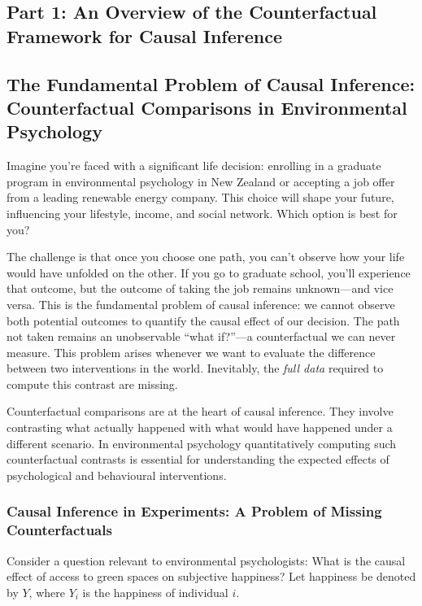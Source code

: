 \documentclass[
  singlecolumn]{article}
\begin{document}
\subsection{Part 1: An Overview of the Counterfactual Framework for
Causal Inference}\label{section-part1}

\subsection{The Fundamental Problem of Causal Inference: Counterfactual
Comparisons in Environmental
Psychology}\label{the-fundamental-problem-of-causal-inference-counterfactual-comparisons-in-environmental-psychology}

Imagine you're faced with a significant life decision: enrolling in a
graduate program in environmental psychology in New Zealand or accepting
a job offer from a leading renewable energy company. This choice will
shape your future, influencing your lifestyle, income, and social
network. Which option is best for you?

The challenge is that once you choose one path, you can't observe how
your life would have unfolded on the other. If you go to graduate
school, you'll experience that outcome, but the outcome of taking the
job remains unknown---and vice versa. This is the fundamental problem of
causal inference: we cannot observe both potential outcomes to quantify
the causal effect of our decision. The path not taken remains an
unobservable ``what if?''---a counterfactual we can never measure. This
problem arises whenever we want to evaluate the difference between two
interventions in the world. Inevitably, the \emph{full data} required to
compute this contrast are missing.

Counterfactual comparisons are at the heart of causal inference. They
involve contrasting what actually happened with what would have happened
under a different scenario. In environmental psychology quantitatively
computing such counterfactual contrasts is essential for understanding
the expected effects of psychological and behavioural interventions.

\subsubsection{Causal Inference in Experiments: A Problem of Missing
Counterfactuals}\label{causal-inference-in-experiments-a-problem-of-missing-counterfactuals}

Consider a question relevant to environmental psychologists: What is the
causal effect of access to green spaces on subjective happiness? Let
happiness be denoted by \(Y\), where \(Y_i\) is the happiness of
individual \(i\).
\end{document}
